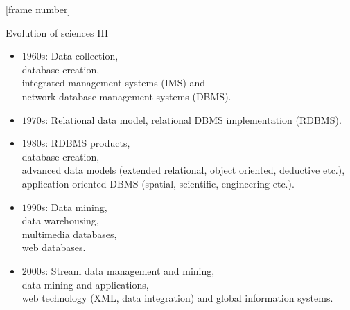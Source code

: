 \documentclass[aspectratio=169,t]{beamer}
\begin{document}
  {
    [frame number]
    \begin{frame}{Evolution of sciences III}
        \begin{itemize}
            \item $1960$s: Data collection, \\
                  \hspace{1cm} database creation, \\
                  \hspace{1cm} integrated management systems (IMS) and \\
                  \hspace{1cm} network database management systems (DBMS).
            \item $1970$s: Relational data model, relational DBMS implementation (RDBMS).
            \item $1980$s: RDBMS products,\\
                  \hspace{1cm} database creation, \\
                  \hspace{1cm} advanced data models (extended relational, object oriented, deductive etc.),\\
                  \hspace{1cm} application-oriented DBMS (spatial, scientific, engineering etc.).
            \item $1990$s: Data mining,\\
                  \hspace{1cm} data warehousing, \\
                  \hspace{1cm} multimedia databases,\\
                  \hspace{1cm} web databases.
            \item $2000$s: Stream data management and mining,\\
                  \hspace{1cm} data mining and applications, \\
                  \hspace{1cm} web technology (XML, data integration) and global information systems.
        \end{itemize}
    \end{frame}
  }
\end{document}
